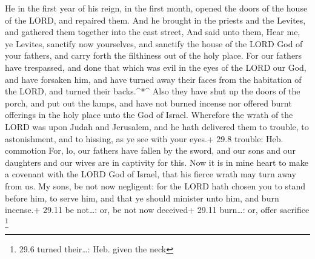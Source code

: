  He in the first year of his reign, in the first month,
opened the doors of the house of the LORD, and repaired them.
 And he brought in the priests and the Levites, and gathered
them together into the east street,  And said unto them,
Hear me, ye Levites, sanctify now yourselves, and sanctify the house of
the LORD God of your fathers, and carry forth the filthiness out of the
holy place.  For our fathers have trespassed, and done that
which was evil in the eyes of the LORD our God, and have forsaken him,
and have turned away their faces from the habitation of the LORD, and
turned their backs.\^{}*\^{}  Also they have shut up the
doors of the porch, and put out the lamps, and have not burned incense
nor offered burnt offerings in the holy place unto the God of Israel.
 Wherefore the wrath of the LORD was upon Judah and
Jerusalem, and he hath delivered them to trouble, to astonishment, and
to hissing, as ye see with your eyes.+ 29.8 trouble: Heb. commotion
 For, lo, our fathers have fallen by the sword, and our sons
and our daughters and our wives are in captivity for this. 
Now it is in mine heart to make a covenant with the LORD God of Israel,
that his fierce wrath may turn away from us.  My sons, be
not now negligent: for the LORD hath chosen you to stand before him, to
serve him, and that ye should minister unto him, and burn incense.+
29.11 be not\ldots: or, be not now deceived+ 29.11 burn\ldots: or, offer
sacrifice \footnote{29.6 turned their\ldots: Heb. given the neck}

